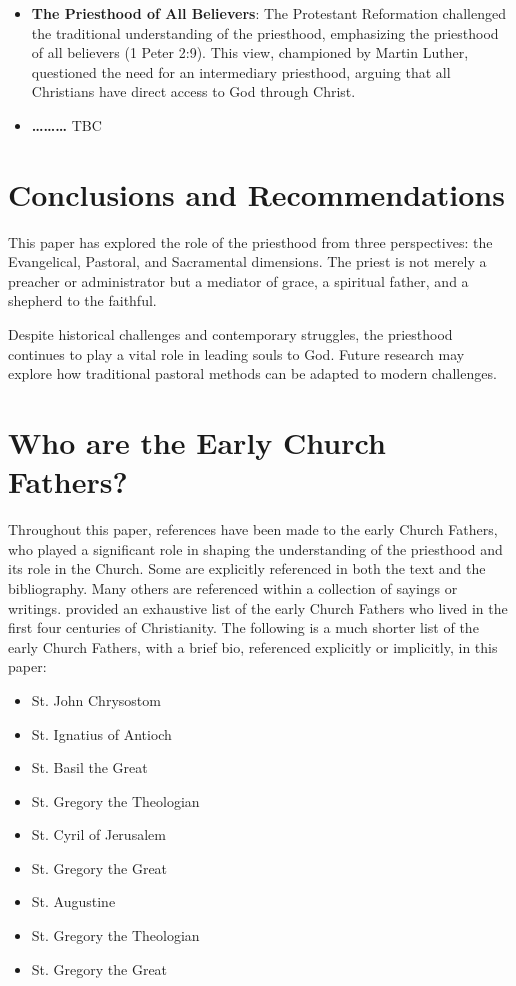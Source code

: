 \documentclass[12pt, doc]{apa7}   	%
\begin{document}
\begin{itemize}
    \item \textbf{The Priesthood of All Believers}: The Protestant Reformation challenged the traditional understanding of the priesthood, emphasizing the priesthood of all believers (1 Peter 2:9). This view, championed by Martin Luther, questioned the need for an intermediary priesthood, arguing that all Christians have direct access to God through Christ.
    
    \item \textbf{\dots \dots \dots} TBC

\end{itemize}

\section{Conclusions and Recommendations}

This paper has explored the role of the priesthood from three perspectives: the Evangelical, Pastoral, and Sacramental dimensions. The priest is not merely a preacher or administrator but a mediator of grace, a spiritual father, and a shepherd to the faithful. 

Despite historical challenges and contemporary struggles, the priesthood continues to play a vital role in leading souls to God. Future research may explore how traditional pastoral methods can be adapted to modern challenges.


\appendix{}
\section{Who are the Early Church Fathers?}\label{early_fathers}
Throughout this paper, references have been made to the early Church Fathers, who played a significant role in shaping the understanding of the priesthood and its role in the Church.  Some are explicitly referenced in both the text and the bibliography.  Many others are referenced within a collection of sayings or writings. \citet{early_church_akin} provided an exhaustive list of the early Church Fathers who lived in the first four centuries of Christianity.  The following is a much shorter list of the early Church Fathers, with a brief bio, referenced explicitly or implicitly, in this paper:

\begin{itemize}
    \item St. John Chrysostom
    \item St. Ignatius of Antioch
    \item St. Basil the Great
    \item St. Gregory the Theologian
    \item St. Cyril of Jerusalem
    \item St. Gregory the Great
    \item St. Augustine
    \item St. Gregory the Theologian
    \item St. Gregory the Great
\end{itemize}
\end{document}
